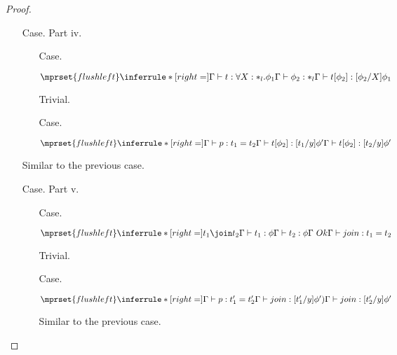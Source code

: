 \begin{proof}
\begin{itemize}
\item[Case.] Part iv.\\
  \begin{itemize}
  \item[Case.] \ \\
    \begin{center}
      \begin{math}
        $$\mprset{flushleft}
        \inferrule* [right=] {
          \Gamma \vdash t:\forall X:*_l.\phi_1
          \\
          \Gamma \vdash \phi_2:*_l
        }{\Gamma \vdash t[\phi_2]: [\phi_2/X]\phi_1}
      \end{math} 
    \end{center}
    Trivial.

  \item[Case.] \ \\
    \begin{center}
      \begin{math}
        $$\mprset{flushleft}
        \inferrule* [right=] {
          \Gamma \vdash p:t_1 = t_2
          \\
          \Gamma \vdash t[\phi_2]:[t_1/y]\phi'
        }{\Gamma \vdash t[\phi_2]:[t_2/y]\phi'}
      \end{math}
    \end{center}
  \end{itemize}
  Similar to the previous case.

\item[Case.] Part v.\\
  \begin{itemize}
  \item[Case.] \ \\
    \begin{center}
      \begin{math}
        $$\mprset{flushleft}
        \inferrule* [right=] {
          t_1 \join t_2
	  \\
          \Gamma \vdash t_1:\phi
          \\
          \Gamma \vdash t_2:\phi
          \\
	  \Gamma\ Ok
        }{\Gamma \vdash join : t_1 = t_2}
      \end{math}
    \end{center}
    Trivial.
  
  \item[Case.] \ \\
    \begin{center}
      \begin{math}
        $$\mprset{flushleft}
        \inferrule* [right=] {
          \Gamma \vdash p:t'_1 = t'_2
          \\
          \Gamma \vdash join:[t'_1/y]\phi')
        }{\Gamma \vdash join:[t'_2/y]\phi'}
      \end{math}
    \end{center}
    Similar to the previous case.
  \end{itemize}
\end{itemize}
\end{proof}

